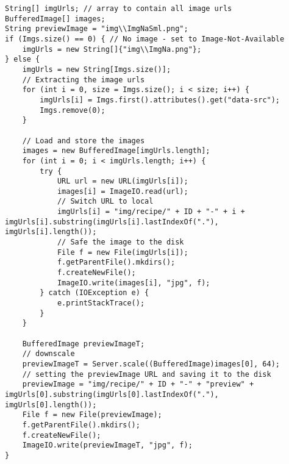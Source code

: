 

\begin{lstlisting}[caption={Verarbeitung der Rezeptbilder},
label=lst:recipeImportImages ]
String[] imgUrls; // array to contain all image urls
BufferedImage[] images;
String previewImage = "img\\ImgNaSml.png";
if (Imgs.size() == 0) {	// No image - set to Image-Not-Available
	imgUrls = new String[]{"img\\ImgNa.png"};
} else {
	imgUrls = new String[Imgs.size()];
	// Extracting the image urls
	for (int i = 0, size = Imgs.size(); i < size; i++) {
		imgUrls[i] = Imgs.first().attributes().get("data-src");
		Imgs.remove(0);
	}

	// Load and store the images
	images = new BufferedImage[imgUrls.length];
	for (int i = 0; i < imgUrls.length; i++) {
		try {
			URL url = new URL(imgUrls[i]);
			images[i] = ImageIO.read(url);
			// Switch URL to local
			imgUrls[i] = "img/recipe/" + ID + "-" + i + imgUrls[i].substring(imgUrls[i].lastIndexOf("."), imgUrls[i].length());
			// Safe the image to the disk
			File f = new File(imgUrls[i]);
			f.getParentFile().mkdirs();
			f.createNewFile();
			ImageIO.write(images[i], "jpg", f);
		} catch (IOException e) {
			e.printStackTrace();
		}
	}

	BufferedImage previewImageT;
	// downscale
	previewImageT = Server.scale((BufferedImage)images[0], 64);
	// setting the previewImage URL and saving it to the disk
	previewImage = "img/recipe/" + ID + "-" + "preview" + imgUrls[0].substring(imgUrls[0].lastIndexOf("."), imgUrls[0].length());
	File f = new File(previewImage);
	f.getParentFile().mkdirs();
	f.createNewFile();
	ImageIO.write(previewImageT, "jpg", f);
}
\end{lstlisting}






